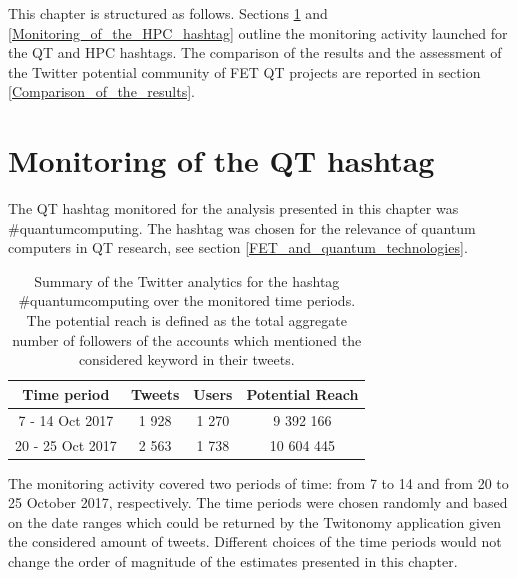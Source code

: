 This chapter is structured as follows. Sections \ref{Monitoring_of_the_QT_hashtag} and \ref{Monitoring_of_the_HPC_hashtag} outline the monitoring activity launched for the QT and HPC hashtags. The comparison of the results and the assessment of the Twitter potential community of FET QT projects are reported in section \ref{Comparison_of_the_results}. 

\section{Monitoring of the QT hashtag} \label{Monitoring_of_the_QT_hashtag}
The QT hashtag monitored for the analysis presented in this chapter was \#quantumcomputing. The hashtag was chosen for the relevance of quantum computers in QT research, see section \ref{FET_and_quantum_technologies}. 

\begin{table}[t]
 \begin{center}
  \begin{tabular}{cccc}
   \hline 
   \hline
   Time period & Tweets & Users & Potential Reach \\ 
   \hline
   \hline
   7 - 14 Oct 2017 & 1 928 & 1 270 & 9 392 166  \\
   20 - 25 Oct 2017 & 2 563 & 1 738 & 10 604 445  \\
   \hline
   \hline
  \end{tabular}
 \end{center} 
 \caption{Summary of the Twitter analytics for the hashtag \#quantumcomputing over the monitored time periods. The potential reach is defined as the total aggregate number of followers of the accounts which mentioned the considered keyword in their tweets.}
\label{Summary_QuantumComputing} 
\end{table}

The monitoring activity covered two periods of time: from 7 to 14 and from 20 to 25 October 2017, respectively. The time periods were chosen randomly and based on the date ranges which could be returned by the Twitonomy application given the considered amount of tweets. Different choices of the time periods would not change the order of magnitude of the estimates presented in this chapter.

